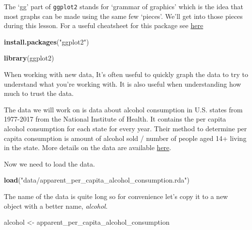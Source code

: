 \documentclass[
  12pt,
]{book}
\newenvironment{Shaded}{\begin{snugshade}}{\end{snugshade}}
\newcommand{\KeywordTok}[1]{\textcolor[rgb]{0.13,0.29,0.53}{\textbf{#1}}}
\newcommand{\NormalTok}[1]{#1}
\newcommand{\StringTok}[1]{\textcolor[rgb]{0.31,0.60,0.02}{#1}}
\begin{document}
The `gg' part of \texttt{ggplot2} stands for `grammar of graphics' which is the idea that most graphs can be made using the same few `pieces'. We'll get into those pieces during this lesson. For a useful cheatsheet for this package see \href{https://www.rstudio.com/wp-content/uploads/2015/03/ggplot2-cheatsheet.pdf}{here}

\begin{Shaded}
\begin{Highlighting}[]
\KeywordTok{install.packages}\NormalTok{(}\StringTok{"ggplot2"}\NormalTok{)}
\end{Highlighting}
\end{Shaded}

\begin{Shaded}
\begin{Highlighting}[]
\KeywordTok{library}\NormalTok{(ggplot2)}
\end{Highlighting}
\end{Shaded}

When working with new data, It's often useful to quickly graph the data to try to understand what you're working with. It is also useful when understanding how much to trust the data.

The data we will work on is data about alcohol consumption in U.S. states from 1977-2017 from the National Institute of Health. It contains the per capita alcohol consumption for each state for every year. Their method to determine per capita consumption is amount of alcohol sold / number of people aged 14+ living in the state. More details on the data are available \href{https://www.openicpsr.org/openicpsr/project/105583/version/V2/view}{here}.

Now we need to load the data.

\begin{Shaded}
\begin{Highlighting}[]
\KeywordTok{load}\NormalTok{(}\StringTok{"data/apparent\_per\_capita\_alcohol\_consumption.rda"}\NormalTok{)}
\end{Highlighting}
\end{Shaded}

The name of the data is quite long so for convenience let's copy it to a new object with a better name, \emph{alcohol}.

\begin{Shaded}
\begin{Highlighting}[]
\NormalTok{alcohol <{-}}\StringTok{ }\NormalTok{apparent\_per\_capita\_alcohol\_consumption}
\end{Highlighting}
\end{Shaded}
\end{document}
